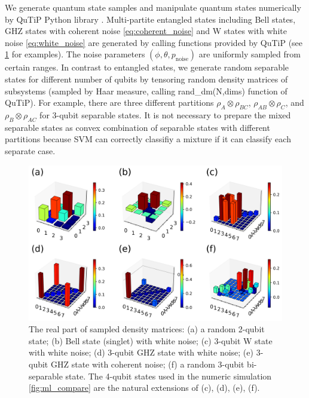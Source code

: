 \documentclass[
aps,
pra,
twocolumn,
floatfix,
]{revtex4-2}
\theoremstyle{plain}
\theoremstyle{definition}
\newcommand{\dm}{\rho}
\newcommand{\noise}{\text{noise}}
\begin{document}
We generate quantum state samples and manipulate quantum states numerically by QuTiP Python library \cite{johanssonQuTiPPythonFramework2013,liPulselevelNoisyQuantum2022}.
Multi-partite entangled states including Bell states, GHZ states with coherent noise \cref{eq:coherent_noise} and W states with white noise \cref{eq:white_noise} are generated by calling functions provided by QuTiP (see \cref{fig:sample_data} for examples).
The noise parameters $(\phi,\theta,p_{\noise})$ are uniformly sampled from certain ranges.
In contrast to entangled states, we generate random separable states for different number of qubits by tensoring random density matrices of subsystems (sampled by Haar measure, calling \textsf{rand\_dm(N,dims)} function of QuTiP).
For example,
there are three different partitions $\dm_A\otimes \dm_{BC}$, $\dm_{AB}\otimes \dm_{C}$, and $\dm_B\otimes \dm_{AC}$ for 3-qubit separable states.
It is not necessary to prepare the mixed separable states as convex combination of separable states with different partitions 
because SVM can correctly classifiy a mixture if it can classify each separate case.
\begin{figure}[!ht]
	\centering
	\includegraphics[width=.9\linewidth]{./Code/dataset_sample_3x2.png}
	\caption{The real part of sampled density matrices: (a) a random 2-qubit state; (b) Bell state (singlet) with white noise; (c) 3-qubit W state with white noise; (d) 3-qubit GHZ state with white noise; (e) 3-qubit GHZ state with coherent noise; (f) a random 3-qubit bi-separable state. The 4-qubit states used in the numeric simulation \cref{fig:ml_compare} are the natural extensions of (c), (d), (e), (f).}
	\label{fig:sample_data}
\end{figure}
\end{document}
